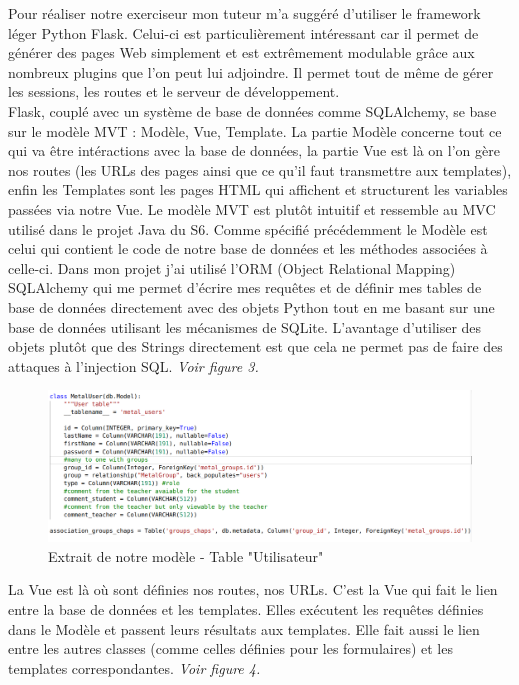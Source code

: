 \documentclass[12pt]{article}
\begin{document}
Pour réaliser notre exerciseur mon tuteur m’a suggéré d’utiliser le framework léger Python Flask. Celui-ci est particulièrement intéressant car il permet de générer des pages Web simplement et est extrêmement modulable grâce aux nombreux plugins que l’on peut lui adjoindre. Il permet tout de même de gérer les sessions, les routes et le serveur de développement. \\
Flask, couplé avec un système de base de données comme SQLAlchemy, se base sur le modèle MVT : Modèle, Vue, Template. La partie Modèle concerne tout ce qui va être intéractions avec la base de données, la partie Vue est là on l'on gère nos routes (les URLs des pages ainsi que ce qu'il faut transmettre aux templates), enfin les Templates sont les pages HTML qui affichent et structurent les variables passées via notre Vue. Le modèle MVT est plutôt intuitif et ressemble au MVC utilisé dans le projet Java du S6. 
Comme spécifié précédemment le Modèle est celui qui contient le code de notre base de données et les méthodes associées à celle-ci. Dans mon projet j'ai utilisé l'ORM (Object Relational Mapping) SQLAlchemy qui me permet d'écrire mes requêtes et de définir mes tables de base de données directement avec des objets Python tout en me basant sur une base de données utilisant les mécanismes de SQLite. L'avantage d'utiliser des objets plutôt que des Strings directement est que cela ne permet pas de faire des attaques à l'injection SQL. \textit{Voir figure 3.}

\begin{figure}[h]
    \centering
    \includegraphics[scale=0.3]{ex_models.png}
    \caption{Extrait de notre modèle - Table "Utilisateur" }
    \label{fig:ex_models}
\end{figure}

La Vue est là où sont définies nos routes, nos URLs. C'est la Vue qui fait le lien entre la base de données et les templates. Elles exécutent les requêtes définies dans le Modèle et passent leurs résultats aux templates. Elle fait aussi le lien entre les autres classes (comme celles définies pour les formulaires) et les templates correspondantes. \textit{Voir figure 4.}
\end{document}
